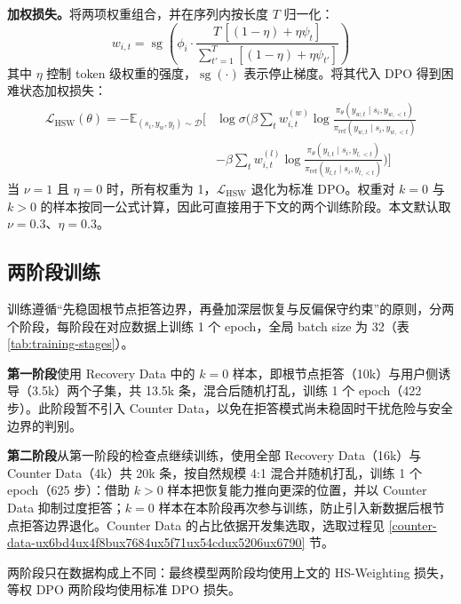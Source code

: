 \documentclass[fontset=fandol,type=master,campus=shenzhen,etitleauto=true]{hithesisbook}
\begin{document}
\textbf{加权损失。}将两项权重组合，并在序列内按长度 $T$ 归一化：
\begin{equation}
w_{i,t} = \operatorname{sg}\!\left( \phi_i \cdot \frac{T\,[(1 - \eta) + \eta \psi_t]}{\sum_{t'=1}^{T} [(1 - \eta) + \eta \psi_{t'}]} \right)
\end{equation}
其中 $\eta$ 控制 token 级权重的强度，$\operatorname{sg}(\cdot)$ 表示停止梯度。将其代入 DPO 得到困难状态加权损失：
\begin{equation}
\begin{aligned}
\mathcal{L}_{\text{HSW}}(\theta) = -\mathbb{E}_{(s_i,y_w,y_l)\sim\mathcal{D}}\Bigg[
&\log\sigma\Bigg(\beta\sum_{t}w_{i,t}^{(w)}\log\frac{\pi_\theta(y_{w,t}\mid s_i,y_{w,<t})}{\pi_{\text{ref}}(y_{w,t}\mid s_i,y_{w,<t})} \\
&-\beta\sum_{t}w_{i,t}^{(l)}\log\frac{\pi_\theta(y_{l,t}\mid s_i,y_{l,<t})}{\pi_{\text{ref}}(y_{l,t}\mid s_i,y_{l,<t})}\Bigg)\Bigg]
\end{aligned}
\end{equation}
当 $\nu = 1$ 且 $\eta = 0$ 时，所有权重为 1，$\mathcal{L}_{\text{HSW}}$ 退化为标准 DPO。权重对 $k = 0$ 与 $k > 0$ 的样本按同一公式计算，因此可直接用于下文的两个训练阶段。本文默认取 $\nu = 0.3$、$\eta = 0.3$。

\subsection{两阶段训练}\label{ux5206ux9636ux6bb5ux8badux7ec3ux7ec4ux7ec7}

训练遵循“先稳固根节点拒答边界，再叠加深层恢复与反偏保守约束”的原则，分两个阶段，每阶段在对应数据上训练 1 个 epoch，全局 batch size 为 32（表 \ref{tab:training-stages}）。

\textbf{第一阶段}使用 Recovery Data 中的 $k = 0$ 样本，即根节点拒答（10k）与用户侧诱导（3.5k）两个子集，共 13.5k 条，混合后随机打乱，训练 1 个 epoch（422 步）。此阶段暂不引入 Counter Data，以免在拒答模式尚未稳固时干扰危险与安全边界的判别。

\textbf{第二阶段}从第一阶段的检查点继续训练，使用全部 Recovery Data（16k）与 Counter Data（4k）共 20k 条，按自然规模 4:1 混合并随机打乱，训练 1 个 epoch（625 步）：借助 $k > 0$ 样本把恢复能力推向更深的位置，并以 Counter Data 抑制过度拒答；$k = 0$ 样本在本阶段再次参与训练，防止引入新数据后根节点拒答边界退化。Counter Data 的占比依据开发集选取，选取过程见 \ref{counter-data-ux6bd4ux4f8bux7684ux5f71ux54cdux5206ux6790} 节。

两阶段只在数据构成上不同：最终模型两阶段均使用上文的 HS-Weighting 损失，等权 DPO 两阶段均使用标准 DPO 损失。
\end{document}
